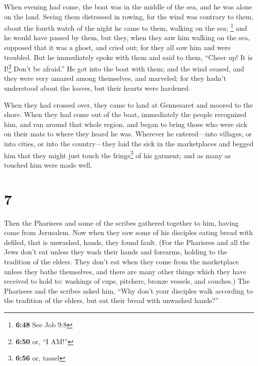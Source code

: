  When evening had come, the boat was in the middle of the
sea, and he was alone on the land.  Seeing them
distressed in rowing, for the wind was contrary to them, about the
fourth watch of the night he came to them, walking on the sea;
\footnote{\textbf{6:48} See Job 9:8} and he would have passed by them,
 but they, when they saw him walking on the sea, supposed
that it was a ghost, and cried out;  for they all saw him
and were troubled. But he immediately spoke with them and said to them,
``Cheer up! It is I!\footnote{\textbf{6:50} or, ``I AM!''} Don't be
afraid.''  He got into the boat with them; and the wind
ceased, and they were very amazed among themselves, and marveled;
 for they hadn't understood about the loaves, but their
hearts were hardened.

 When they had crossed over, they came to land at
Gennesaret and moored to the shore.  When they had come
out of the boat, immediately the people recognized him, 
and ran around that whole region, and began to bring those who were sick
on their mats to where they heard he was.  Wherever he
entered---into villages, or into cities, or into the country---they laid
the sick in the marketplaces and begged him that they might just touch
the fringe\footnote{\textbf{6:56} or, tassel} of his garment; and as
many as touched him were made well.

\hypertarget{section-6}{%
\section{7}\label{section-6}}

 Then the Pharisees and some of the scribes gathered
together to him, having come from Jerusalem.  Now when
they saw some of his disciples eating bread with defiled, that is
unwashed, hands, they found fault.  (For the Pharisees and
all the Jews don't eat unless they wash their hands and forearms,
holding to the tradition of the elders.  They don't eat
when they come from the marketplace unless they bathe themselves, and
there are many other things which they have received to hold to:
washings of cups, pitchers, bronze vessels, and couches.) 
The Pharisees and the scribes asked him, ``Why don't your disciples walk
according to the tradition of the elders, but eat their bread with
unwashed hands?''

